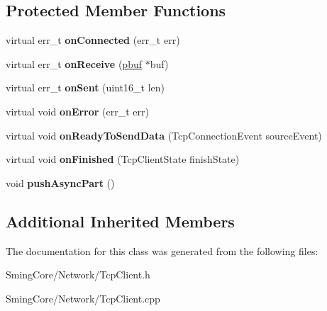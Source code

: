 \subsection*{Protected Member Functions}
\begin{DoxyCompactItemize}
\item 
\hypertarget{class_tcp_client_a45b8fb12ee004796d53ddbed19a18f47}{}virtual err\+\_\+t {\bfseries on\+Connected} (err\+\_\+t err)\label{class_tcp_client_a45b8fb12ee004796d53ddbed19a18f47}

\item 
\hypertarget{class_tcp_client_aa756d90a9f145de249073adf51326a35}{}virtual err\+\_\+t {\bfseries on\+Receive} (\hyperlink{structpbuf}{pbuf} $\ast$buf)\label{class_tcp_client_aa756d90a9f145de249073adf51326a35}

\item 
\hypertarget{class_tcp_client_aa5636a7fbd1272a72fee443c30e450a8}{}virtual err\+\_\+t {\bfseries on\+Sent} (uint16\+\_\+t len)\label{class_tcp_client_aa5636a7fbd1272a72fee443c30e450a8}

\item 
\hypertarget{class_tcp_client_afeb67a00dabb644f1e7868e4605031b5}{}virtual void {\bfseries on\+Error} (err\+\_\+t err)\label{class_tcp_client_afeb67a00dabb644f1e7868e4605031b5}

\item 
\hypertarget{class_tcp_client_aea9b23efa5fc8b975b509344c52fa8b9}{}virtual void {\bfseries on\+Ready\+To\+Send\+Data} (Tcp\+Connection\+Event source\+Event)\label{class_tcp_client_aea9b23efa5fc8b975b509344c52fa8b9}

\item 
\hypertarget{class_tcp_client_ac36af0e7978a712b0833d40151f4ff85}{}virtual void {\bfseries on\+Finished} (Tcp\+Client\+State finish\+State)\label{class_tcp_client_ac36af0e7978a712b0833d40151f4ff85}

\item 
\hypertarget{class_tcp_client_a162be33aa3e851eb92ccd361f64c6706}{}void {\bfseries push\+Async\+Part} ()\label{class_tcp_client_a162be33aa3e851eb92ccd361f64c6706}

\end{DoxyCompactItemize}
\subsection*{Additional Inherited Members}


The documentation for this class was generated from the following files\+:\begin{DoxyCompactItemize}
\item 
Sming\+Core/\+Network/Tcp\+Client.\+h\item 
Sming\+Core/\+Network/Tcp\+Client.\+cpp\end{DoxyCompactItemize}
